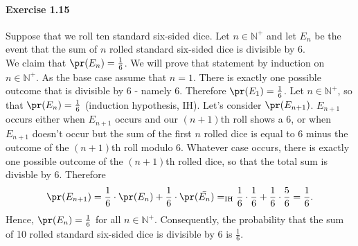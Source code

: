 \paragraph{Exercise 1.15} Suppose that we roll ten standard six-sided dice.
Let $n \in \mathbb{N}^+$ and let $E_n$ be the event that the sum of $n$ rolled
standard six-sided dice is divisible by 6. \\
We claim that $\pr(E_n) = \frac{1}{6}$. We will prove that statement by induction
on $n \in \mathbb{N}^+$. As the base case assume that $n=1$. There is exactly one
possible outcome that is divisible by 6 - namely 6. Therefore $\pr(E_1) = \frac{1}{6}$.
Let $n \in \mathbb{N}^+$, so that $\pr(E_n) = \frac{1}{6}$ (induction hypothesis,
IH). Let's consider $\pr(E_{n+1})$. $E_{n+1}$ occurs either when $E_{n+1}$ occurs
and our $(n+1)$th roll shows a 6, or when $E_{n+1}$ doesn't occur but the sum of
the first $n$ rolled dice is equal to 6 minus the outcome of the $(n+1)$th roll
modulo 6. Whatever case occurs, there is exactly one possible outcome of the
$(n+1)$th rolled dice, so that the total sum is divisble by 6. Therefore
\[
  \pr(E_{n+1})
    = \frac{1}{6} \cdot \pr(E_n) + \frac{1}{6} \cdot \pr(\bar{E_n})
    =_{\text{IH}} \frac{1}{6} \cdot \frac{1}{6} + \frac{1}{6} \cdot \frac{5}{6}
    = \frac{1}{6}.
\]
Hence, $\pr(E_n) = \frac{1}{6}$ for all $n \in \mathbb{N}^+$. Consequently, the
probability that the sum of 10 rolled standard six-sided dice is divisible by
6 is $\frac{1}{6}$.

